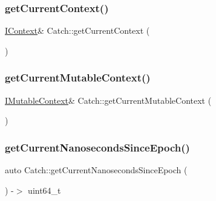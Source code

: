 \mbox{\label{namespace_catch_ad517cca9b21deb79101e90e5508dd161}} 
\subsubsection{\texorpdfstring{getCurrentContext()}{getCurrentContext()}}
{\footnotesize\ttfamily \mbox{\hyperlink{struct_catch_1_1_i_context}{I\+Context}}\& Catch\+::get\+Current\+Context (\begin{DoxyParamCaption}{ }\end{DoxyParamCaption})\hspace{0.3cm}{\ttfamily [inline]}}

\mbox{\label{namespace_catch_af7bb0c32ab2453d2f53e92a96d15360e}} 
\subsubsection{\texorpdfstring{getCurrentMutableContext()}{getCurrentMutableContext()}}
{\footnotesize\ttfamily \mbox{\hyperlink{struct_catch_1_1_i_mutable_context}{I\+Mutable\+Context}}\& Catch\+::get\+Current\+Mutable\+Context (\begin{DoxyParamCaption}{ }\end{DoxyParamCaption})\hspace{0.3cm}{\ttfamily [inline]}}

\mbox{\label{namespace_catch_a98d058468488c486a9cb5c8463f3ba29}} 
\subsubsection{\texorpdfstring{getCurrentNanosecondsSinceEpoch()}{getCurrentNanosecondsSinceEpoch()}}
{\footnotesize\ttfamily auto Catch\+::get\+Current\+Nanoseconds\+Since\+Epoch (\begin{DoxyParamCaption}{ }\end{DoxyParamCaption}) -\/$>$  uint64\+\_\+t}

